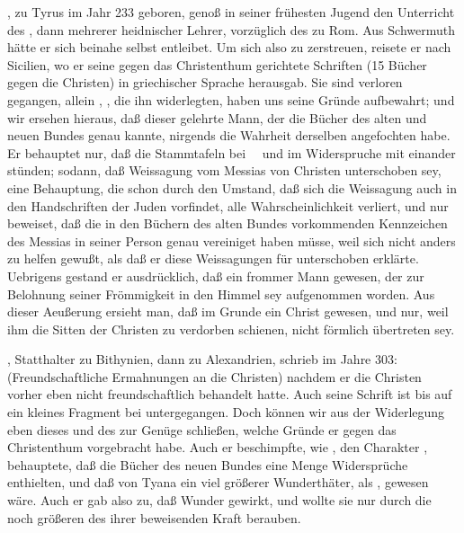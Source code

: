 \begin{aufza}
\begin{aufzb}
\item {}, zu Tyrus im Jahr 233 geboren, genoß in seiner frühesten Jugend den Unterricht des , dann mehrerer heidnischer Lehrer, vorzüglich des  zu Rom. Aus Schwermuth hätte er sich beinahe selbst entleibet. Um sich also zu zerstreuen, reisete er nach Sicilien, wo er seine gegen das Christenthum gerichtete Schriften (15 Bücher gegen die Christen) in griechischer Sprache herausgab. Sie sind verloren gegangen, allein , \uA , die ihn widerlegten, haben uns seine Gründe aufbewahrt; und wir ersehen hieraus, daß dieser gelehrte Mann, der die Bücher des alten und neuen Bundes genau kannte, nirgends die Wahrheit derselben angefochten habe. Er behauptet nur, daß die Stammtafeln bei ~\ und  im Widerspruche mit einander stünden; sodann, daß  Weissagung vom Messias von Christen unterschoben sey, eine Behauptung, die schon durch den Umstand, daß sich die Weissagung auch in den Handschriften der Juden vorfindet, alle Wahrscheinlichkeit verliert, und nur beweiset, daß  die in den Büchern des alten Bundes vorkommenden Kennzeichen des Messias in seiner Person genau vereiniget haben müsse, weil sich  nicht anders zu helfen gewußt, als daß er diese Weissagungen für unterschoben erklärte. Uebrigens gestand er ausdrücklich, daß  ein frommer Mann gewesen, der zur Belohnung seiner Frömmigkeit in den Himmel sey aufgenommen worden. Aus dieser Aeußerung ersieht man, daß  im Grunde ein Christ gewesen, und nur, weil ihm die Sitten der Christen zu verdorben schienen, nicht förmlich übertreten sey.
\item {}, Statthalter zu Bithynien, dann zu Alexandrien, schrieb im Jahre 303: (Freundschaftliche Ermahnungen an die Christen) nachdem er die Christen vorher eben nicht freundschaftlich behandelt hatte. Auch seine Schrift ist bis auf ein kleines Fragment bei  untergegangen. Doch können wir aus der Widerlegung eben dieses  und des  zur Genüge schließen, welche Gründe er gegen das Christenthum vorgebracht habe. Auch er beschimpfte, wie , den Charakter , behauptete, daß die Bücher des neuen Bundes eine Menge Widersprüche enthielten, und daß  von Tyana ein viel größerer Wunderthäter, als , gewesen wäre. Auch er gab also zu, daß  Wunder gewirkt, und wollte sie nur durch die noch größeren des  ihrer beweisenden Kraft berauben.

\end{aufzb}
\end{aufza}
